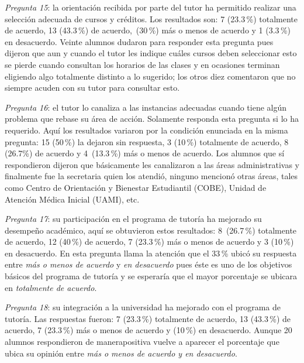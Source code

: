 \enlargethispage{1\baselineskip}
\textit{Pregunta 15}: la orientación recibida por parte del tutor ha
permitido realizar una selección adecuada de cursos y créditos. Los
resultados son: 7 (23.3\,\%) totalmente de acuerdo, 13 (43.3\,\%) de acuerdo,~(30\,\%) más o menos de acuerdo y 1 (3.3\,\%) en desacuerdo. Veinte alumnos
dudaron para responder esta pregunta pues dijeron que aun y cuando el tutor
les indique cuáles cursos deben seleccionar esto se pierde cuando consultan
los horarios de las clases y en ocasiones terminan eligiendo algo
totalmente distinto a lo sugerido; los otros diez comentaron que no siempre
acuden con su tutor para consultar esto.


\textit{Pregunta 16}: el tutor lo canaliza a las instancias adecuadas
cuando tiene algún problema que rebase su área de acción. Solamente
responda esta pregunta si lo ha requerido. Aquí los resultados variaron por
la condición enunciada en la misma pregunta: 15 (50\,\%) la dejaron sin
respuesta, 3 (10\,\%) totalmente de acuerdo, 8 (26.7\%) de acuerdo y 4~(13.3\,\%) 
más o menos de acuerdo. Los alumnos que sí respondieron dijeron
que básicamente les canalizaron a las áreas administrativas y finalmente
fue la secretaria quien los atendió, ninguno mencionó otras áreas, tales
como Centro de Orientación y Bienestar Estudiantil (COBE), Unidad de
Atención Médica Inicial (UAMI), etc\@.


\textit{Pregunta 17}: su participación en el programa de tutoría ha
mejorado su desempeño académico, aquí se obtuvieron estos resultados: 8~(26.7\,\%) 
totalmente de acuerdo, 12 (40\,\%) de acuerdo, 7 (23.3\,\%) más o
menos de acuerdo y 3 (10\,\%) en desacuerdo. En esta pregunta llama la
atención que el 33\,\% ubicó su respuesta entre \textit{más o menos de
acuerdo} y \textit{en desacuerdo} pues éste es uno de los objetivos básicos
del programa de tutoría y se esperaría que el mayor porcentaje se ubicara
en \textit{totalmente de acuerdo}. 

\enlargethispage{1\baselineskip}
\textit{Pregunta 18}: su integración a la universidad ha mejorado con
el programa de tutoría. Las respuestas fueron: 7 (23.3\,\%) totalmente de
acuerdo, 13 (43.3\,\%) de acuerdo, 7 (23.3\,\%) más o menos de acuerdo y
(10\,\%) en desacuerdo. Aunque 20 alumnos respondieron de manera\linebreak positiva
vuelve a aparecer el porcentaje que ubica su opinión entre \textit{más o
menos de acuerdo y en desacuerdo}.


